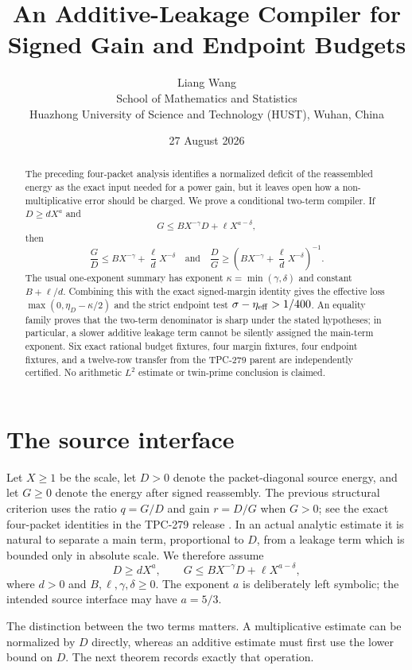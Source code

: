 \documentclass[11pt]{article}
\title{An Additive-Leakage Compiler for Signed Gain and Endpoint Budgets}
\author{Liang Wang\\
School of Mathematics and Statistics\\
Huazhong University of Science and Technology (HUST), Wuhan, China}
\date{27 August 2026}
\begin{document}
\maketitle

\begin{abstract}
The preceding four-packet analysis identifies a normalized deficit of the
reassembled energy as the exact input needed for a power gain, but it leaves
open how a non-multiplicative error should be charged.  We prove a conditional
two-term compiler.  If $D\ge dX^a$ and
\[
 G\le B X^{-\gamma}D+\ell X^{a-\delta},
\]
then
\[
 \frac GD\le B X^{-\gamma}+\frac\ell dX^{-\delta}
 \quad\text{and}\quad
 \frac DG\ge\left(B X^{-\gamma}+\frac\ell dX^{-\delta}\right)^{-1}.
\]
The usual one-exponent summary has exponent
$\kappa=\min(\gamma,\delta)$ and constant $B+\ell/d$.
Combining this with the exact signed-margin identity gives the effective loss
$\max(0,\eta_D-\kappa/2)$ and the strict endpoint test
$\sigma-\eta_{\rm eff}>1/400$.  An equality family proves that the two-term
denominator is sharp under the stated hypotheses; in particular, a slower
additive leakage term cannot be silently assigned the main-term exponent.
Six exact rational budget fixtures, four margin fixtures, four endpoint
fixtures, and a twelve-row transfer from the TPC-279 parent are independently
certified.  No arithmetic $L^2$ estimate or twin-prime conclusion is claimed.
\end{abstract}

\section{The source interface}

Let $X\ge1$ be the scale, let $D>0$ denote the packet-diagonal source
energy, and let $G\ge0$ denote the energy after signed reassembly.  The
previous structural criterion uses the ratio $q=G/D$ and gain $r=D/G$
when $G>0$; see the exact four-packet identities in the TPC-279 release
\cite{tpc279}.  In an actual analytic estimate it is natural to separate a
main term, proportional to $D$, from a leakage term which is bounded only in
absolute scale.  We therefore assume
\begin{equation}
 D\ge dX^a,\qquad
 G\le B X^{-\gamma}D+\ell X^{a-\delta},
 \label{eq:raw}
\end{equation}
where $d>0$ and $B,\ell,\gamma,\delta\ge0$.  The exponent $a$ is deliberately
left symbolic; the intended source interface may have $a=5/3$.

The distinction between the two terms matters.  A multiplicative estimate
can be normalized by $D$ directly, whereas an additive estimate must first use
the lower bound on $D$.  The next theorem records exactly that operation.
\end{document}
